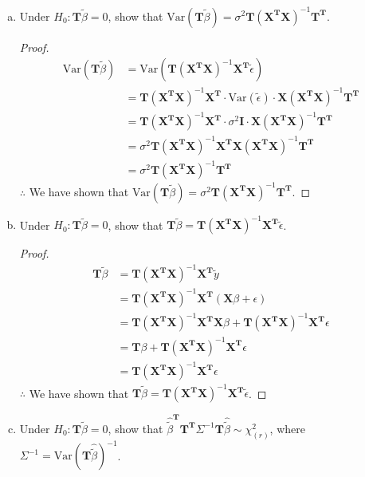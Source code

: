 \documentclass[12pt]{article}
\newcommand{\ytilde}{\tilde{y}}
\newcommand{\X}{\mathbf{X}}
\newcommand{\btilde}{\tilde{\beta}}
\newcommand{\etilde}{\tilde{\epsilon}}
\newcommand{\I}{\mathbf{I}}
\newcommand{\T}{\mathbf{T}}
\begin{document}
\begin{enumerate}[1.]
\begin{enumerate}[a)]
                    \item Under $H_0: \T\btilde = 0$, show that $\text{Var}(\T \btilde) = \sigma^2 \T (\X^\T \X)^{-1} \T^\T$.
                        \begin{proof}
                            \begin{align*}
                                \text{Var}(\T \btilde) &= \text{Var}(\T (\X^\T \X)^{-1} \X^\T \etilde) \\
                                &= \T (\X^\T \X)^{-1} \X^\T  \cdot \text{Var}(\etilde) \cdot \X (\X^\T \X)^{-1} \T^\T \\
                                &= \T (\X^\T \X)^{-1} \X^\T \cdot \sigma^2 \I \cdot \X (\X^\T \X)^{-1} \T^\T \\
                                &= \sigma^2 \T (\X^\T \X)^{-1} \X^\T \X (\X^\T \X)^{-1} \T^\T \\
                                &= \sigma^2 \T (\X^\T \X)^{-1} \T^\T
                            \end{align*}
                            $\therefore$ We have shown that $\text{Var}(\T \btilde) = \sigma^2 \T (\X^\T \X)^{-1} \T^\T$.
                        \end{proof}
                    \item Under $H_0: \T\btilde = 0$, show that 
                        $\T \btilde = \T (\X^\T \X)^{-1} \X^\T \etilde$.
                        \begin{proof}
                            \begin{align*}
                                \T \btilde &= \T (\X^\T \X)^{-1} \X^\T \ytilde \\
                                &= \T (\X^\T \X)^{-1} \X^\T (\X \beta + \epsilon) \\
                                &= \T (\X^\T \X)^{-1} \X^\T \X \beta + \T (\X^\T \X)^{-1} \X^\T \epsilon \\
                                &= \T \beta + \T (\X^\T \X)^{-1} \X^\T \epsilon \\
                                &= \T (\X^\T \X)^{-1} \X^\T \epsilon
                            \end{align*}
                            $\therefore$ We have shown that $\T \btilde = \T (\X^\T \X)^{-1} \X^\T \etilde$.
                        \end{proof}

                    \item Under $H_0: \T\btilde = 0$, show that $\hat{\btilde}^\T \T^\T \Sigma^{-1} \T\hat{\btilde} \sim \chi_{(r)}^2$, where 
                    $\Sigma^{-1} = \text{Var}(\T\hat{\btilde})^{-1}$.


\end{enumerate}
\end{enumerate}
\end{document}
